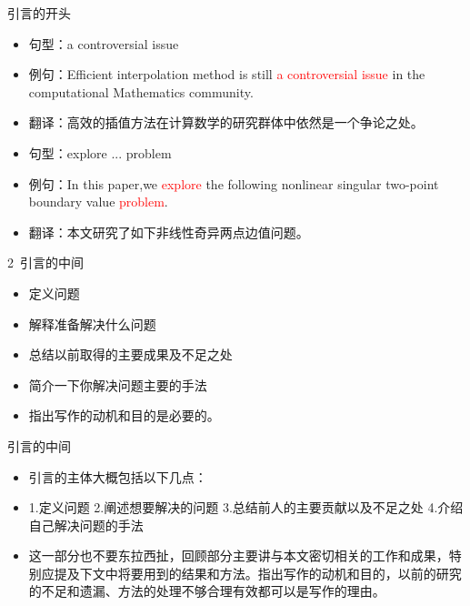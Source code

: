 \documentclass[13pt]{ctexbeamer}
\newcommand{\red}[1]{\textcolor{red}{#1}}
\begin{document}
\begin{frame}{引言的开头}

    \begin{itemize}
        \item 句型：a controversial issue
        \item 例句：Efficient interpolation method is still  \red{a controversial issue} in the computational Mathematics community.
        \item 翻译：高效的插值方法在计算数学的研究群体中依然是一个争论之处。
        \newline
        \item 句型：explore ... problem
        \item 例句：In this paper,we \red{explore} the following nonlinear singular two-point boundary value \red{problem}.
        \item 翻译：本文研究了如下非线性奇异两点边值问题。
    \end{itemize}
\end{frame}


\begin{frame}{2~引言的中间}
	\begin{itemize}

		\item 定义问题

		\item 解释准备解决什么问题
		\item 总结以前取得的主要成果及不足之处
		\item 简介一下你解决问题主要的手法
		\item 指出写作的动机和目的是必要的。
	\end{itemize}
\end{frame}



\begin{frame}{引言的中间}

\begin{itemize}
    \item
    引言的主体大概包括以下几点：
    \item
    1.定义问题  2.阐述想要解决的问题  3.总结前人的主要贡献以及不足之处  4.介绍自己解决问题的手法
    \item
    这一部分也不要东拉西扯，回顾部分主要讲与本文密切相关的工作和成果，特别应提及下文中将要用到的结果和方法。指出写作的动机和目的，以前的研究的不足和遗漏、方法的处理不够合理有效都可以是写作的理由。
\end{itemize}
\end{frame}
\end{document}
